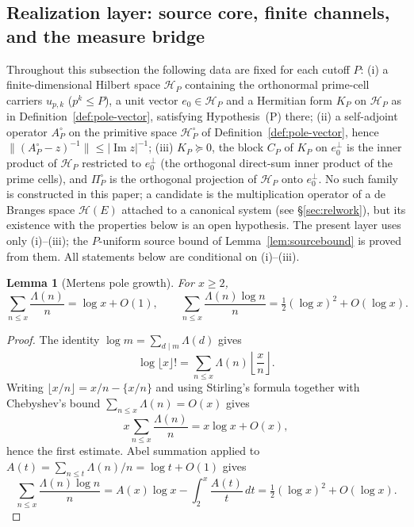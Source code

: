 \documentclass[11pt]{amsart}
\newtheorem{lemma}[theorem]{Lemma}
\theoremstyle{definition}
\theoremstyle{remark}
\theoremstyle{definition}
\renewcommand{\Im}{\operatorname{Im}}
\newcommand{\half}{\tfrac{1}{2}}
\newcommand{\Lam}{\Lambda}
\newcommand{\cH}{\mathcal{H}}
\begin{document}
\subsection{Realization layer: source core, finite channels, and the measure bridge}\label{sec:shorting}

Throughout this subsection the following data are fixed for each cutoff $P$:
\textnormal{(i)} a finite-dimensional Hilbert space $\cH_P$ containing the orthonormal prime-cell
carriers $u_{p,k}$ ($p^k\le P$), a unit vector $e_0\in\cH_P$ and a Hermitian form $K_P$ on $\cH_P$ as
in Definition~\ref{def:pole-vector}, satisfying Hypothesis~(P) there;
\textnormal{(ii)} a self-adjoint operator $A_P^\circ$ on the primitive space $\cH_P^\circ$ of
Definition~\ref{def:pole-vector}, hence $\|(A_P^\circ-z)^{-1}\|\le|\Im z|^{-1}$;
\textnormal{(iii)} $K_P\succeq0$, the block $C_P$ of $K_P$ on $e_0^\perp$ is the inner product of
$\cH_P$ restricted to $e_0^\perp$ (the orthogonal direct-sum inner product of the prime cells), and
$\Pi_P^\circ$ is the orthogonal projection of $\cH_P$ onto $e_0^\perp$.
No such family is constructed in this paper; a candidate is the multiplication operator of a de Branges space $\mathcal H(E)$
attached to a canonical system \cite{deBranges} (see \S\ref{sec:relwork}), but its existence with the
properties below is an open hypothesis. The present layer uses only (i)--(iii); the $P$-uniform source
bound of Lemma~\ref{lem:sourcebound} is proved from them. All statements below are conditional on
(i)--(iii).

\begin{lemma}[Mertens pole growth]\label{lem:mertens-pole}
For $x\ge2$,
\[
   \sum_{n\le x}\frac{\Lam(n)}{n}=\log x+O(1),\qquad
   \sum_{n\le x}\frac{\Lam(n)\log n}{n}=\half(\log x)^2+O(\log x).
\]
\end{lemma}

\begin{proof}
The identity $\log m=\sum_{d\mid m}\Lam(d)$ gives
\[
   \log\lfloor x\rfloor!=\sum_{n\le x}\Lam(n)\left\lfloor\frac{x}{n}\right\rfloor.
\]
Writing $\lfloor x/n\rfloor=x/n-\{x/n\}$ and using Stirling's formula together with Chebyshev's bound
$\sum_{n\le x}\Lam(n)=O(x)$ gives
\[
   x\sum_{n\le x}\frac{\Lam(n)}{n}=x\log x+O(x),
\]
hence the first estimate.  Abel summation applied to
$A(t)=\sum_{n\le t}\Lam(n)/n=\log t+O(1)$ gives
\[
   \sum_{n\le x}\frac{\Lam(n)\log n}{n}
   =A(x)\log x-\int_2^x\frac{A(t)}{t}\,dt
   =\half(\log x)^2+O(\log x).
\]
\end{proof}
\end{document}
